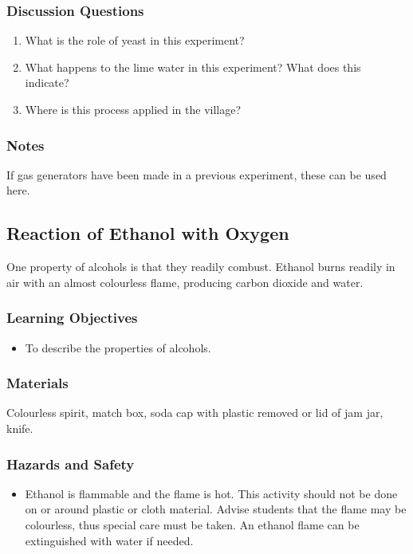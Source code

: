\subsubsection*{Discussion Questions}
\begin{enumerate}
\item{What is the role of yeast in this experiment?}
\item{What happens to the lime water in this experiment? What does this indicate?}
\item{Where is this process applied in the village?}
\end{enumerate}

\subsubsection*{Notes}
If gas generators have been made in a previous experiment, these can be used here.

\subsection{Reaction of Ethanol with Oxygen}

One property of alcohols is that they readily combust. Ethanol burns readily in air with an almost colourless flame, producing carbon dioxide and water.

\subsubsection*{Learning Objectives}
\begin{itemize}
\item{To describe the properties of alcohols.}
\end{itemize}

\subsubsection*{Materials}
Colourless spirit, match box, soda cap with plastic removed or lid of jam jar, knife.

\subsubsection*{Hazards and Safety}
\begin{itemize}
\item{Ethanol is flammable and the flame is hot. This activity should not be done on or around plastic or cloth material. Advise students that the flame may be colourless, thus special care must be taken. An ethanol flame can be extinguished with water if needed.}
\end{itemize}

